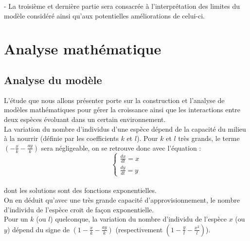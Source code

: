 \documentclass{article}
\begin{document}
- La troisième et dernière partie sera consacrée à l'interprétation des limites du modèle considéré ainsi qu'aux potentielles améliorations de celui-ci.



\newpage

\setcounter{secnumdepth}{2}
\section{Analyse mathématique}
\subsection{Analyse du modèle}
\vspace{0.4cm}
L’étude que nous allons présenter porte sur la construction et l’analyse de modèles mathématiques pour gérer la croissance ainsi que les interactions entre deux espèces évoluant dans un certain environnement.\\
La variation du nombre d'individus d'une espèce dépend de la capacité du milieu à la nourrir (définie par les coefficients $k$ et $l$). Pour $k$ et $l$ très grands, le terme $(- \frac{x}{k} - \frac{a y}{k})$ sera négligeable, on se retrouve donc avec l'équation : 
\begin{equation*}
\left\{
\begin{array}{ll}
    \frac{dx}{dt} = x \\
    \frac{dy}{dt} = y
\end{array}
\right.
\end{equation*}
\\dont les solutions sont des fonctions exponentielles. \\

On en déduit qu'avec une très grande capacité d'approvisionnement, le nombre d'individu de l'espèce croit de façon exponentielle. \\
Pour un $k$ (ou $l$) quelconque, la variation du nombre d'individu de l'espèce $x$ (ou $y$) dépend du signe de \hspace{0.1cm} $(1 - \frac{x}{k} - \frac{a y}{k})$ \hspace{0.1cm} (respectivement $ (1 -\frac{y}{l} - \frac{x^{2}}{l})$).\\\\\\
\end{document}
